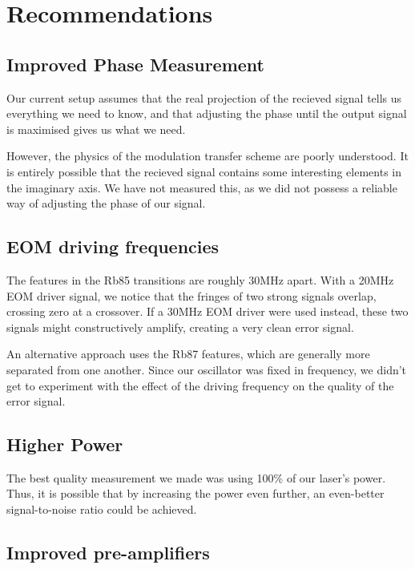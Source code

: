 \newpage

\section{Recommendations}

\subsection{Improved Phase Measurement}

Our current setup assumes that the real projection of the recieved signal tells us everything we need to know, and that adjusting the phase until the output signal is maximised gives us what we need.

However, the physics of the modulation transfer scheme are poorly understood.  It is entirely possible that the recieved signal contains some interesting elements in the imaginary axis.  We have not measured this, as we did not possess a reliable way of adjusting the phase of our signal.

\subsection{EOM driving frequencies}

The features in the Rb85 transitions are roughly 30MHz apart.  With a 20MHz EOM driver signal, we notice that the fringes of two strong signals overlap, crossing zero at a crossover.  If a 30MHz EOM driver were used instead, these two signals might constructively amplify, creating a very clean error signal.

An alternative approach uses the Rb87 features, which are generally more separated from one another.  Since our oscillator was fixed in frequency, we didn't get to experiment with the effect of the driving frequency on the quality of the error signal.

\subsection{Higher Power}

The best quality measurement we made was using 100\% of our laser's power.  Thus, it is possible that by increasing the power even further, an even-better signal-to-noise ratio could be achieved.

\subsection{Improved pre-amplifiers}

